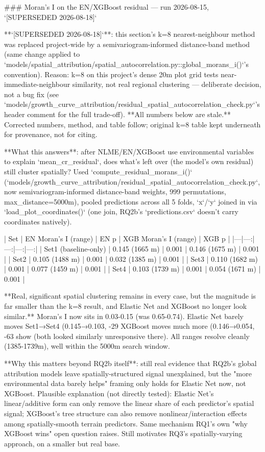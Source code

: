 ### Moran's I on the EN/XGBoost residual — run 2026-08-15, `[SUPERSEDED 2026-08-18]`

**`[SUPERSEDED 2026-08-18]`**: this section's k=8 nearest-neighbour method was replaced project-wide
by a semivariogram-informed distance-band method (same change applied to
`models/spatial_attribution/spatial_autocorrelation.py::global_morans_i()`'s convention). Reason:
k=8 on this project's dense 20m plot grid tests near-immediate-neighbour similarity, not real
regional clustering — deliberate decision, not a bug fix (see
`models/growth_curve_attribution/residual_spatial_autocorrelation_check.py`'s header comment for
the full trade-off). **All numbers below are stale.** Corrected numbers, method, and table follow;
original k=8 table kept underneath for provenance, not for citing.

**What this answers**: after NLME/EN/XGBoost use environmental variables to explain
`mean_cr_residual`, does what's left over (the model's own residual) still cluster spatially? Used
`compute_residual_morans_i()` (`models/growth_curve_attribution/residual_spatial_autocorrelation_check.py`,
now semivariogram-informed distance-band weights, 999 permutations, max_distance=5000m), pooled
predictions across all 5 folds, `x`/`y` joined in via `load_plot_coordinates()` (one join, RQ2b's
`predictions.csv` doesn't carry coordinates natively).

| Set | EN Moran's I (range) | EN p | XGB Moran's I (range) | XGB p |
|---|---:|---:|---:|---:|
| Set1 (baseline-only) | 0.145 (1665 m) | 0.001 | 0.146 (1675 m) | 0.001 |
| Set2 | 0.105 (1488 m) | 0.001 | 0.032 (1385 m) | 0.001 |
| Set3 | 0.110 (1682 m) | 0.001 | 0.077 (1459 m) | 0.001 |
| Set4 | 0.103 (1739 m) | 0.001 | 0.054 (1671 m) | 0.001 |

**Real, significant spatial clustering remains in every case, but the magnitude is far smaller than
the k=8 result, and Elastic Net and XGBoost no longer look similar.** Moran's I now sits in
0.03-0.15 (was 0.65-0.74). Elastic Net barely moves Set1→Set4 (0.145→0.103, -29%
XGBoost moves much more (0.146→0.054, -63%
show (both looked similarly unresponsive there). All ranges resolve cleanly (1385-1739m), well
within the 5000m search window.

**Why this matters beyond RQ2b itself**: still real evidence that RQ2b's global attribution models
leave spatially-structured signal unexplained, but the "more environmental data barely helps"
framing only holds for Elastic Net now, not XGBoost. Plausible explanation (not directly tested):
Elastic Net's linear/additive form can only remove the linear share of each predictor's spatial
signal; XGBoost's tree structure can also remove nonlinear/interaction effects among
spatially-smooth terrain predictors. Same mechanism RQ1's own "why XGBoost wins" open question
raises. Still motivates RQ3's spatially-varying approach, on a smaller but real base.


